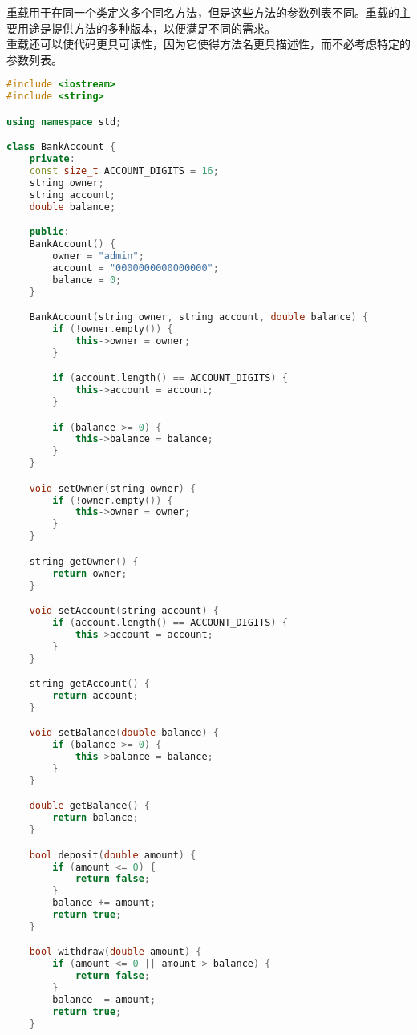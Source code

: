 重载用于在同一个类定义多个同名方法，但是这些方法的参数列表不同。重载的主要用途是提供方法的多种版本，以便满足不同的需求。\\

重载还可以使代码更具可读性，因为它使得方法名更具描述性，而不必考虑特定的参数列表。\\


\begin{lstlisting}[language=C++]
#include <iostream>
#include <string>

using namespace std;

class BankAccount {
    private:
    const size_t ACCOUNT_DIGITS = 16;
    string owner;
    string account;
    double balance;

    public:
    BankAccount() {
        owner = "admin";
        account = "0000000000000000";
        balance = 0;
    }

    BankAccount(string owner, string account, double balance) {
        if (!owner.empty()) {
            this->owner = owner;
        }

        if (account.length() == ACCOUNT_DIGITS) {
            this->account = account;
        }

        if (balance >= 0) {
            this->balance = balance;
        }
    }

    void setOwner(string owner) {
        if (!owner.empty()) {
            this->owner = owner;
        }
    }

    string getOwner() {
        return owner;
    }

    void setAccount(string account) {
        if (account.length() == ACCOUNT_DIGITS) {
            this->account = account;
        }
    }

    string getAccount() {
        return account;
    }

    void setBalance(double balance) {
        if (balance >= 0) {
            this->balance = balance;
        }
    }

    double getBalance() {
        return balance;
    }

    bool deposit(double amount) {
        if (amount <= 0) {
            return false;
        }
        balance += amount;
        return true;
    }

    bool withdraw(double amount) {
        if (amount <= 0 || amount > balance) {
            return false;
        }
        balance -= amount;
        return true;
    }


\end{lstlisting}
